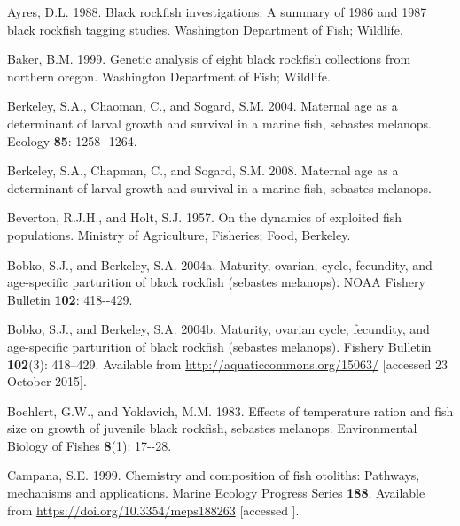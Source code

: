 \documentclass[11pt,
  english,
  letterpaper,
]{article}
\newlength{\cslhangindent}
\newenvironment{CSLReferences}[2] %
 {%
  \setlength{\parindent}{0pt}
  \ifodd #1 \everypar{\setlength{\hangindent}{\cslhangindent}}\ignorespaces\fi
  \ifnum #2 > 0
  \setlength{\parskip}{#2\baselineskip}
  \fi
 }%
 {}
\begin{document}
\hypertarget{refs}{}
\begin{CSLReferences}{1}{0}
\leavevmode{}%
Ayres, D.L. 1988. Black rockfish investigations: A summary of 1986 and 1987 black rockfish tagging studies. Washington Department of Fish; Wildlife.

\leavevmode{}%
Baker, B.M. 1999. Genetic analysis of eight black rockfish collections from northern oregon. Washington Department of Fish; Wildlife.

\leavevmode{}%
Berkeley, S.A., Chaoman, C., and Sogard, S.M. 2004. Maternal age as a determinant of larval growth and survival in a marine fish, sebastes melanops. Ecology \textbf{85}: 1258-\/-1264.

\leavevmode{}%
Berkeley, S.A., Chapman, C., and Sogard, S.M. 2008. Maternal age as a determinant of larval growth and survival in a marine fish, sebastes melanops.

\leavevmode{}%
Beverton, R.J.H., and Holt, S.J. 1957. On the dynamics of exploited fish populations. Ministry of Agriculture, Fisheries; Food, Berkeley.

\leavevmode{}%
Bobko, S.J., and Berkeley, S.A. 2004a. Maturity, ovarian, cycle, fecundity, and age-specific parturition of black rockfish (sebastes melanops). NOAA Fishery Bulletin \textbf{102}: 418-\/-429.

\leavevmode{}%
Bobko, S.J., and Berkeley, S.A. 2004b. Maturity, ovarian cycle, fecundity, and age-specific parturition of black rockfish (sebastes melanops). Fishery Bulletin \textbf{102}(3): 418--429. Available from \url{http://aquaticcommons.org/15063/} {[}accessed 23 October 2015{]}.

\leavevmode{}%
Boehlert, G.W., and Yoklavich, M.M. 1983. Effects of temperature ration and fish size on growth of juvenile black rockfish, sebastes melanops. Environmental Biology of Fishes \textbf{8}(1): 17-\/-28.

\leavevmode{}%
Campana, S.E. 1999. Chemistry and composition of fish otoliths: Pathways, mechanisms and applications. Marine Ecology Progress Series \textbf{188}. Available from \url{https://doi.org/10.3354/meps188263} {[}accessed {]}.


\end{CSLReferences}
\end{document}
